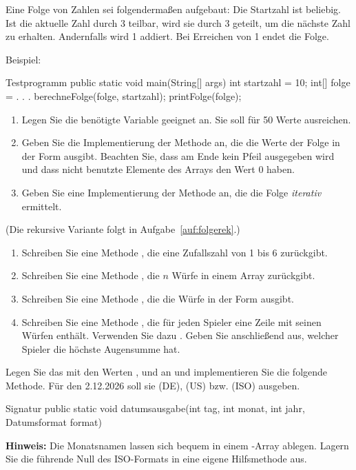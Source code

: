 Eine Folge von Zahlen sei folgendermaßen aufgebaut: Die Startzahl ist beliebig. Ist die aktuelle Zahl durch 3 teilbar, wird sie durch 3 geteilt, um die nächste Zahl zu erhalten. Andernfalls wird 1 addiert. Bei Erreichen von 1 endet die Folge.

Beispiel: 
\begin{javacode}[Ausschnitt]{Testprogramm}
public static void main(String[] args) {
	int startzahl = 10;
	int[] folge = . . .
	berechneFolge(folge, startzahl);
	printFolge(folge);
}
\end{javacode}
\begin{enumerate}[label=\alph*)]
\item Legen Sie die benötigte Variable  geeignet an. Sie soll für 50 Werte ausreichen.
\item Geben Sie die Implementierung der Methode  an, die die Werte der Folge in der Form  ausgibt. Beachten Sie, dass am Ende kein Pfeil ausgegeben wird und dass nicht benutzte Elemente des Arrays den Wert 0 haben.
\item Geben Sie eine Implementierung der Methode  an, die die Folge \emph{iterativ} ermittelt.
\end{enumerate}
(Die rekursive Variante folgt in Aufgabe~\ref{auf:folgerek}.)

\begin{enumerate}[label=\alph*)]
\item Schreiben Sie eine Methode , die eine Zufallszahl von 1 bis 6 zurückgibt.
\item Schreiben Sie eine Methode , die $n$ Würfe in einem Array zurückgibt.
\item Schreiben Sie eine Methode , die die Würfe in der Form  ausgibt.
\item Schreiben Sie eine Methode , die für jeden Spieler eine Zeile mit seinen Würfen enthält. Verwenden Sie dazu . Geben Sie anschließend aus, welcher Spieler die höchste Augensumme hat.
\end{enumerate}

Legen Sie das  mit den Werten ,  und  an und implementieren Sie die folgende Methode. Für den 2.12.2026 soll sie  (DE),  (US) bzw.  (ISO) ausgeben.
\begin{javacode}[Ausschnitt]{Signatur}
public static void datumsausgabe(int tag, int monat, int jahr, Datumsformat format)
\end{javacode}
\begin{hinweis}
\textbf{Hinweis:} Die Monatsnamen lassen sich bequem in einem -Array ablegen. Lagern Sie die führende Null des ISO-Formats in eine eigene Hilfsmethode aus.
\end{hinweis}

